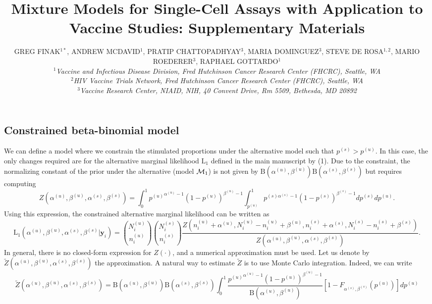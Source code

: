 \documentclass{article}
\title{Mixture Models for Single-Cell Assays with Application to Vaccine Studies: Supplementary Materials}
\author{GREG FINAK$^{1\ast}$, 
 ANDREW MCDAVID$^{1}$,
 PRATIP CHATTOPADHYAY$^{3}$,
 MARIA DOMINGUEZ$^{3}$,
 STEVE DE ROSA$^{1,2}$,
 MARIO ROEDERER$^{3}$, 
 RAPHAEL GOTTARDO$^{1}$\\
\textit{ $^{1}$Vaccine and Infectious Disease Division, Fred Hutchinson Cancer Research Center (FHCRC), Seattle, WA\\
 $^{2}$HIV Vaccine Trials Network, Fred Hutchinson Cancer Research Center (FHCRC), Seattle, WA\\
 $^{3}$Vaccine Research Center, NIAID, NIH, 40 Convent Drive, Rm 5509, Bethesda, MD 20892}}
\date{}
\begin{document}
\maketitle
\appendix
\renewcommand{\thesubsection}{Appendix \Alph{subsection}:}
\setcounter{subsection}{0}
\renewcommand{\figurename}{\textbf{Supplementary Figure}}
\renewcommand{\thefigure}{\textbf{\arabic{figure}}}
\setcounter{figure}{0}

\section*{}

\subsection{Constrained beta-binomial model}
\label{supp:constrained}
We can define a model where we constrain the stimulated proportions under the alternative model such that $p^{(s)}>p^{(u)}$. In this case, the only changes required are for the alternative marginal likelihood $\mathrm{L}_1$ defined in the main manuscript by (1). Due to the constraint, the normalizing constant of the prior under the alternative (model ${\cal M}_1$) is not given by $\mathrm{B}(\alpha^{(u)},\beta^{(u)})\mathrm{B}(\alpha^{(s)},\beta^{(s)})$ but requires computing \[
Z(\alpha^{(u)}, \beta^{(u)}, \alpha^{(s)}, \beta^{(s)})=\int_{0}^1{p^{(u)}}^{\alpha^{(u)}-1}(1-p^{(u)})^{\beta^{(u)}-1}\int_{p^{(u)}}^1 p^{(s)\alpha^{(s)}-1}(1-p^{(s)})^{\beta^{(s)}-1}dp^{(s)}dp^{(u)}.
\]
Using this expression, the constrained alternative marginal likelihood can be written as
\[
\mathrm{L}_1(\alpha^{(u)},\beta^{(u)},\alpha^{(s)},\beta^{(s)}|\mathbf{y}_i)
=\binom{N^{(u)}_{i}}{n^{(u)}_{i}} \binom{N^{(s)}_{i}}{n^{(s)}_{i}}\frac{Z(n^{(u)}_{i}+\alpha^{(u)},N^{(u)}_{i}-n^{(u)}_{i}+\beta^{(u)},n^{(s)}_{i}+\alpha^{(s)},N^{(s)}_{i}-n^{(s)}_{i}+\beta^{(s)})}{Z(\alpha^{(u)},\beta^{(u)},\alpha^{(s)},\beta^{(s)})}.
\label{model2:constrained}
\]
In general, there is no closed-form expression for $Z(\cdot)$, and a numerical approximation must be used. Let us denote by $\tilde{Z}(\alpha^{(u)}, \beta^{(u)}, \alpha^{(s)}, \beta^{(s)})$ the approximation. A natural way to estimate $\tilde{Z}$ is to use Monte Carlo integration. Indeed, we can write
\begin{equation}
\tilde{Z}(\alpha^{(u)}, \beta^{(u)}, \alpha^{(s)}, \beta^{(s)})=\mathrm{B}(\alpha^{(u)},\beta^{(u)})\mathrm{B}(\alpha^{(s)},\beta^{(s)})\int_{0}^1\frac{{p^{(u)}}^{\alpha^{(u)}-1}(1-p^{(u)})^{\beta^{(u)}-1}}{\mathrm{B}(\alpha^{(u)},\beta^{(u)})}[1-F_{\alpha^{(s)},\beta^{(s)}}(p^{(u)})]dp^{(u)}
\label{equ:normZ}
\end{equation}
\end{document}
